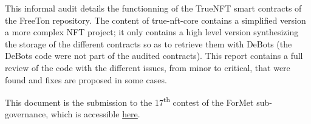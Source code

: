 This informal audit details the functionning of the TrueNFT smart contracts of the 
FreeTon repository.
%
The content of true-nft-core contains a simplified version a more complex NFT
project; it only contains a high level version synthesizing the storage of the different
contracts so as to retrieve them with DeBots (the DeBots code were not part of the 
audited contracts).
%
This report contains a full review of the code with the different issues, from 
minor to critical, that were found and fixes are proposed in some cases.

This document is the submission to the 17\textsuperscript{th} contest of the ForMet sub-governance,
which is accessible
\href{https://formet.gov.freeton.org/proposal?proposalAddress=0\%3Afad8efb6b82a8b321d8b4ce424c8e3362d2de5f96e1df9d702f18bb2d34c6b6f}{here}.
%
